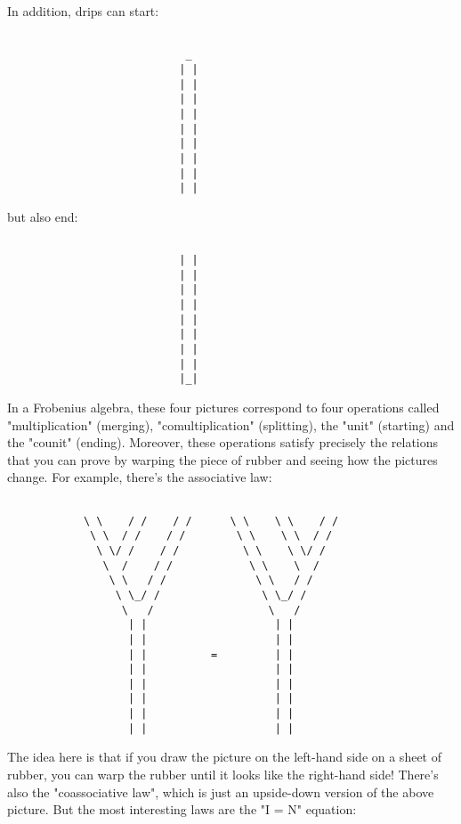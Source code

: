 In addition, drips can start:
                          

\begin{verbatim}

                            _
                           | |
                           | |
                           | |
                           | |
                           | |
                           | |
                           | |
                           | |
                           | |

\end{verbatim}
    
but also end:

                           

\begin{verbatim}

                           | |
                           | |
                           | |
                           | |
                           | |
                           | |
                           | |
                           | |
                           |_|
\end{verbatim}
    

In a Frobenius algebra, these four pictures correspond to four
operations called "multiplication" (merging),
"comultiplication" (splitting), the "unit"
(starting) and the "counit" (ending).  Moreover, these
operations satisfy precisely the relations that you can prove by
warping the piece of rubber and seeing how the pictures change.  For
example, there's the associative law:


\begin{verbatim}

            \ \    / /    / /      \ \    \ \    / /
             \ \  / /    / /        \ \    \ \  / /
              \ \/ /    / /          \ \    \ \/ /
               \  /    / /            \ \    \  /
                \ \   / /              \ \   / /
                 \ \_/ /                \ \_/ /
                  \   /                  \   /
                   | |                    | |
                   | |                    | |    
                   | |          =         | |
                   | |                    | |
                   | |                    | |
                   | |                    | |
                   | |                    | |
                   | |                    | |
\end{verbatim}
    
The idea here is that if you draw the picture on the left-hand side on 
a sheet of rubber, you can warp the rubber until it looks like the 
right-hand side!  There's also the "coassociative law", which is
just an upside-down version of the above picture.   But the most 
interesting laws are the "I = N" equation:


